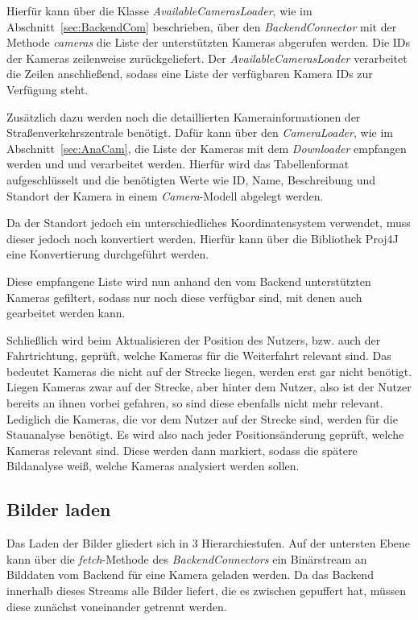 Hierfür kann über die Klasse {\em AvailableCamerasLoader}, wie im Abschnitt~\ref{sec:BackendCom} beschrieben, über den {\em BackendConnector} mit der Methode {\em cameras} die Liste der unterstützten Kameras abgerufen werden.
Die IDs der Kameras zeilenweise zurückgeliefert. Der {\em AvailableCamerasLoader} verarbeitet die Zeilen anschließend, sodass eine Liste der verfügbaren Kamera IDs zur Verfügung steht.

Zusätzlich dazu werden noch die detaillierten Kamerainformationen der Straßenverkehrszentrale benötigt. Dafür kann über den {\em CameraLoader}, wie im Abschnitt~\ref{sec:AnaCam}, die Liste der Kameras mit dem {\em Downloader} empfangen werden und und verarbeitet werden. Hierfür wird das Tabellenformat aufgeschlüsselt und die benötigten Werte wie ID, Name, Beschreibung und Standort der Kamera in einem {\em Camera}-Modell abgelegt werden.

Da der Standort jedoch ein unterschiedliches Koordinatensystem verwendet, muss dieser jedoch noch konvertiert werden. Hierfür kann über die Bibliothek Proj4J~\cite{proj4j} eine Konvertierung durchgeführt werden.

Diese empfangene Liste wird nun anhand den vom Backend unterstützten Kameras gefiltert, sodass nur noch diese verfügbar sind, mit denen auch gearbeitet werden kann.

Schließlich wird beim Aktualisieren der Position des Nutzers, bzw. auch der Fahrtrichtung, geprüft, welche Kameras für die Weiterfahrt relevant sind. Das bedeutet Kameras die nicht auf der Strecke liegen, werden erst gar nicht benötigt. Liegen Kameras zwar auf der Strecke, aber hinter dem Nutzer, also ist der Nutzer bereits an ihnen vorbei gefahren, so sind diese ebenfalls nicht mehr relevant. Lediglich die Kameras, die vor dem Nutzer auf der Strecke sind, werden für die Stauanalyse benötigt. 
Es wird also nach jeder Positionsänderung geprüft, welche Kameras relevant sind. Diese werden dann markiert, sodass die spätere Bildanalyse weiß, welche Kameras analysiert werden sollen.

\subsection{Bilder laden}
Das Laden der Bilder gliedert sich in 3 Hierarchiestufen.
Auf der untersten Ebene kann über die {\em fetch}-Methode des {\em BackendConnectors} ein Binärstream an Bilddaten vom Backend für eine Kamera geladen werden.
Da das Backend innerhalb dieses Streams alle Bilder liefert, die es zwischen gepuffert hat, müssen diese zunächst voneinander getrennt werden.


